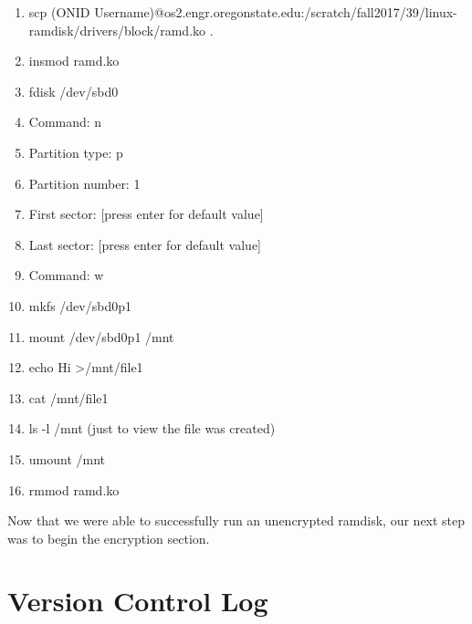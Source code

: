 \documentclass[letterpaper,10pt,draftclsnofoot,onecolumn,titlepage]{IEEEtran}
\begin{document}
	\begin{enumerate}
		\item scp (ONID Username)@os2.engr.oregonstate.edu:/scratch/fall2017/39/linux-ramdisk/drivers/block/ramd.ko .
		\item insmod ramd.ko
		\item fdisk /dev/sbd0

		\item Command: n
		\item Partition type: p
		\item Partition number: 1
		\item First sector: [press enter for default value]
		\item Last sector: [press enter for default value]

		\item Command: w

		\item mkfs /dev/sbd0p1
		\item mount /dev/sbd0p1 /mnt
		\item echo Hi \textgreater /mnt/file1
		\item cat /mnt/file1
		\item ls -l /mnt (just to view the file was created)
		\item umount /mnt
		\item rmmod ramd.ko 
	\end{enumerate}

Now that we were able to successfully run an unencrypted ramdisk, our next step was to begin the encryption section. 

\section{Version Control Log}
\end{document}
